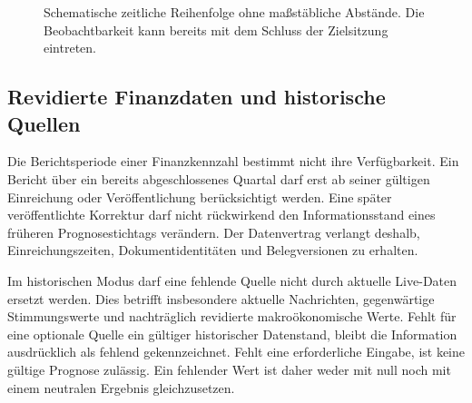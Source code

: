 \begin{figure}[htbp]
\centering
{}
\caption{Schematische zeitliche Reihenfolge ohne maßstäbliche Abstände. Die Beobachtbarkeit kann bereits mit dem Schluss der Zielsitzung eintreten.}
\label{fig:temporal-timeline}
\end{figure}

\subsection{Revidierte Finanzdaten und historische Quellen}
Die Berichtsperiode einer Finanzkennzahl bestimmt nicht ihre Verfügbarkeit. Ein Bericht über ein bereits abgeschlossenes Quartal darf erst ab seiner gültigen Einreichung oder Veröffentlichung berücksichtigt werden. Eine später veröffentlichte Korrektur darf nicht rückwirkend den Informationsstand eines früheren Prognosestichtags verändern. Der Datenvertrag verlangt deshalb, Einreichungszeiten, Dokumentidentitäten und Belegversionen zu erhalten.

Im historischen Modus darf eine fehlende Quelle nicht durch aktuelle Live-Daten ersetzt werden. Dies betrifft insbesondere aktuelle Nachrichten, gegenwärtige Stimmungswerte und nachträglich revidierte makroökonomische Werte. Fehlt für eine optionale Quelle ein gültiger historischer Datenstand, bleibt die Information ausdrücklich als fehlend gekennzeichnet. Fehlt eine erforderliche Eingabe, ist keine gültige Prognose zulässig. Ein fehlender Wert ist daher weder mit null noch mit einem neutralen Ergebnis gleichzusetzen.

